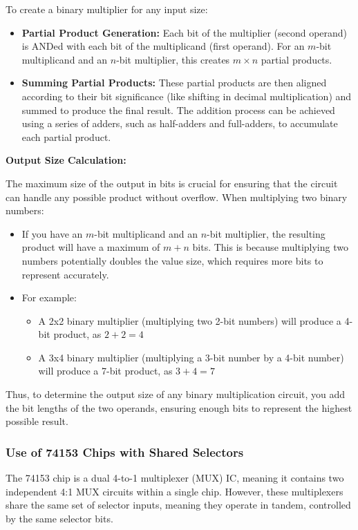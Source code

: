 \documentclass[12pt]{article}
\begin{document}
To create a binary multiplier for any input size:
\begin{itemize}
	\item \textbf{Partial Product Generation:} Each bit of the multiplier (second operand) is ANDed with each bit of the multiplicand (first operand). For an \( m \)-bit multiplicand and an \( n \)-bit multiplier, this creates \( m \times n \) partial products.
	\item \textbf{Summing Partial Products:} These partial products are then aligned according to their bit significance (like shifting in decimal multiplication) and summed to produce the final result. The addition process can be achieved using a series of adders, such as half-adders and full-adders, to accumulate each partial product.
\end{itemize}

\textbf{Output Size Calculation:}

The maximum size of the output in bits is crucial for ensuring that the circuit can handle any possible product without overflow. When multiplying two binary numbers:
\begin{itemize}
	\item If you have an \( m \)-bit multiplicand and an \( n \)-bit multiplier, the resulting product will have a maximum of \( m + n \) bits. This is because multiplying two numbers potentially doubles the value size, which requires more bits to represent accurately.
	\item For example:
	      \begin{itemize}
		      \item A 2x2 binary multiplier (multiplying two 2-bit numbers) will produce a 4-bit product, as \( 2 + 2 = 4 \)
		      \item A 3x4 binary multiplier (multiplying a 3-bit number by a 4-bit number) will produce a 7-bit product, as \( 3 + 4 = 7 \)
	      \end{itemize}
\end{itemize}

Thus, to determine the output size of any binary multiplication circuit, you add the bit lengths of the two operands, ensuring enough bits to represent the highest possible result.

\subsubsection*{Use of 74153 Chips with Shared Selectors}

The 74153 chip is a dual 4-to-1 multiplexer (MUX) IC, meaning it contains two independent 4:1 MUX circuits within a single chip. However, these multiplexers share the same set of selector inputs, meaning they operate in tandem, controlled by the same selector bits.
\end{document}
